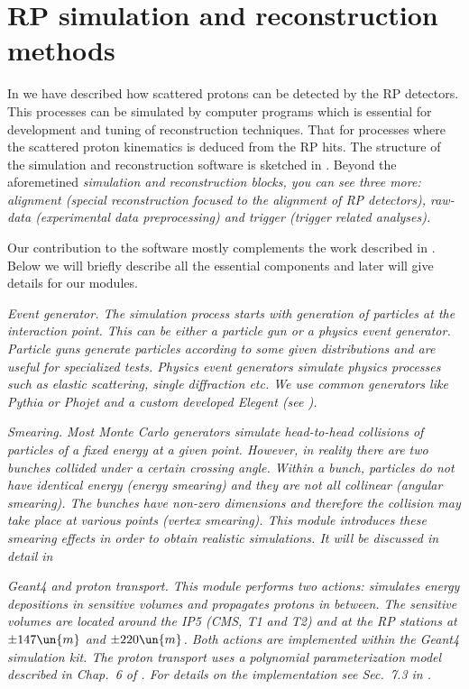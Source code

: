 \chapter{RP simulation and reconstruction methods}

In  we have described how scattered protons can be detected by the RP detectors. This processes can be simulated by computer programs which is essential for development and tuning of reconstruction techniques. That for processes where the scattered proton kinematics is deduced from the RP hits. The structure of the simulation and reconstruction software is sketched in . Beyond the aforemetined \em{simulation} and \em{reconstruction} blocks, you can see three more: \em{alignment} (special reconstruction focused to the alignment of RP detectors), \em{raw-data} (experimental data preprocessing) and \em{trigger} (trigger related analyses).


Our contribution to the software mostly complements the work described in . Below we will briefly describe all the essential components and later will give details for our modules.

\em{Event generator}.
The simulation process starts with generation of particles at the interaction point. This can be either a \em{particle gun} or a \em{physics event generator}. Particle guns generate particles according to some given distributions and are useful for specialized tests. Physics event generators simulate physics processes such as elastic scattering, single diffraction etc. We use common generators like Pythia  or Phojet  and a custom developed Elegent (see ).

\em{Smearing}.
Most Monte Carlo generators simulate head-to-head collisions of particles of a fixed energy at a given point. However, in reality there are two bunches collided under a certain crossing angle. Within a bunch, particles do not have identical energy (energy smearing) and they are not all collinear (angular smearing). The bunches have non-zero dimensions and therefore the collision may take place at various points (vertex smearing). This module introduces these smearing effects in order to obtain realistic simulations. It will be discussed in detail in 

\em{Geant4 and proton transport}.
This module performs two actions: simulates energy depositions in sensitive volumes and propagates protons in between. The sensitive volumes are located around the IP5 (CMS, T1 and T2) and at the RP stations at $\pm 147\un{m}$ and $\pm 220\un{m}$. Both actions are implemented within the Geant4  simulation kit. The proton transport uses a polynomial parameterization model described in Chap.~6 of . For details on the implementation see Sec.~7.3 in .

